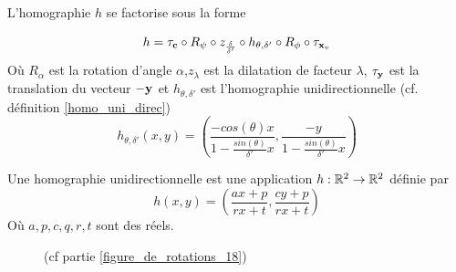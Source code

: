 \begin{prop}
 L'homographie  $h$ se factorise sous la forme
 
\begin{equation}
h = \tau_{\mathbf{c}}   \circ R_{\psi} \circ z_{\frac{\delta}{\delta'}} \circ h_{\theta,\delta'} \circ R_{\phi} \circ \tau_{\mathbf{x}_v}
\label{formul_decomp}
\end{equation}
Où $R_{\alpha}$ est la rotation d'angle $\alpha$,$z_\lambda$ est la dilatation de facteur $\lambda$, $\tau_{\mathbf{y}}$ est  la translation du vecteur $-\mathbf{y}$ et $h_{\theta,\delta'}$ est l'homographie unidirectionnelle (cf. définition \ref{homo_uni_direc})
\begin{equation}
h_{\theta,\delta'}(x,y)=\left(\frac{-cos(\theta)x}{1-\frac{sin(\theta)}{\delta'}x} ,\frac{-y}{1-\frac{sin(\theta)}{\delta'}x}\right)
\label{mise_perspective}
\end{equation}
\label{prop_decomp}
\end{prop}
\begin{Def}
Une homographie unidirectionnelle est une application $h:\mathbb{R}^{2} \rightarrow \mathbb{R}^{2}$ définie par 
\begin{equation*}
h(x,y)=\left ( \frac{ax+p}{rx+t} , \frac{cy+p}{rx+t} \right)
\end{equation*}
Où $a,p,c,q,r,t$ sont des réels.
\label{homo_uni_direc}
\end{Def}
\begin{figure}[h!]
\centering
{}
\caption{(cf partie \ref{figure_de_rotations_18})}
\label{img_angles}
\end{figure}

